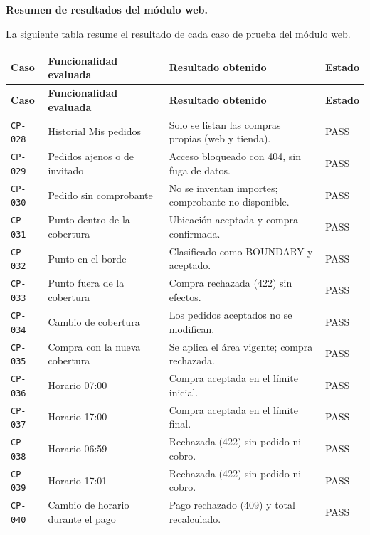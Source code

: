 \par\medskip\noindent\textbf{Resumen de resultados del módulo web.}\par\smallskip
La siguiente tabla resume el resultado de cada caso de prueba del módulo web.

{\footnotesize
\begin{longtable}{|P{1.6cm}|P{4.6cm}|P{7.4cm}|P{1.5cm}|}
\hline
\textbf{Caso} & \textbf{Funcionalidad evaluada} & \textbf{Resultado obtenido} & \textbf{Estado} \\ \hline
\endfirsthead
\hline
\textbf{Caso} & \textbf{Funcionalidad evaluada} & \textbf{Resultado obtenido} & \textbf{Estado} \\ \hline
\endhead
\texttt{CP-028} & Historial Mis pedidos & Solo se listan las compras propias (web y tienda). & PASS \\ \hline
\texttt{CP-029} & Pedidos ajenos o de invitado & Acceso bloqueado con 404, sin fuga de datos. & PASS \\ \hline
\texttt{CP-030} & Pedido sin comprobante & No se inventan importes; comprobante no disponible. & PASS \\ \hline
\texttt{CP-031} & Punto dentro de la cobertura & Ubicación aceptada y compra confirmada. & PASS \\ \hline
\texttt{CP-032} & Punto en el borde & Clasificado como BOUNDARY y aceptado. & PASS \\ \hline
\texttt{CP-033} & Punto fuera de la cobertura & Compra rechazada (422) sin efectos. & PASS \\ \hline
\texttt{CP-034} & Cambio de cobertura & Los pedidos aceptados no se modifican. & PASS \\ \hline
\texttt{CP-035} & Compra con la nueva cobertura & Se aplica el área vigente; compra rechazada. & PASS \\ \hline
\texttt{CP-036} & Horario 07:00 & Compra aceptada en el límite inicial. & PASS \\ \hline
\texttt{CP-037} & Horario 17:00 & Compra aceptada en el límite final. & PASS \\ \hline
\texttt{CP-038} & Horario 06:59 & Rechazada (422) sin pedido ni cobro. & PASS \\ \hline
\texttt{CP-039} & Horario 17:01 & Rechazada (422) sin pedido ni cobro. & PASS \\ \hline
\texttt{CP-040} & Cambio de horario durante el pago & Pago rechazado (409) y total recalculado. & PASS \\ \hline

\end{longtable}}
